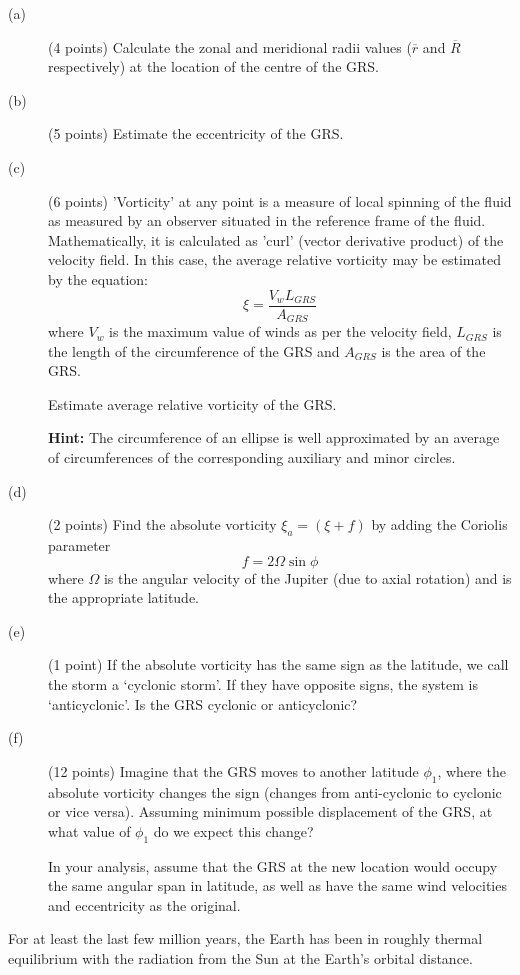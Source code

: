 \begin{description}
\item[(a)] (4 points) Calculate the zonal and meridional radii values ($\overline{r}$
  and $\overline{R}$ respectively) at the location of the centre of the GRS.
\item[(b)] (5 points) Estimate the eccentricity of the GRS.
\item[(c)] (6 points) 'Vorticity' at any point is a measure of local spinning
  of the fluid as measured by an observer situated in the reference frame of
  the fluid. Mathematically, it is calculated as 'curl' (vector derivative
  product) of the velocity field. In this case, the average relative
  vorticity may be estimated by the equation:
  \[ \xi = \frac{V_w L_{GRS}}{A_{GRS}} \]
  where $V_w$ is the maximum value of winds as per the velocity field,
  $L_{GRS}$ is the length of the circumference of the GRS and $A_{GRS}$ is
  the area of the GRS.

  Estimate average relative vorticity of the GRS.

  \textbf{Hint:} The circumference of an ellipse is well approximated by an
  average of circumferences of the corresponding auxiliary and minor circles.
\item[(d)] (2 points) Find the absolute vorticity $\xi_a = (\xi + f)$ by
  adding the Coriolis parameter
  \[ f = 2\Omega \sin\phi \]
  where $\Omega$ is the angular velocity of the Jupiter (due to axial
  rotation) and is the appropriate latitude.
\item[(e)] (1 point) If the absolute vorticity has the same sign as the
  latitude, we call the storm a `cyclonic storm'. If they have opposite
  signs, the system is `anticyclonic'. Is the GRS cyclonic or anticyclonic?
\item[(f)] (12 points) Imagine that the GRS moves to another latitude
  $\phi_1$, where the absolute vorticity changes the sign (changes from
  anti-cyclonic to cyclonic or vice versa). Assuming minimum possible
  displacement of the GRS, at what value of $\phi_1$ do we expect this
  change?

  In your analysis, assume that the GRS at the new location would occupy the
  same angular span in latitude, as well as have the same wind velocities and
  eccentricity as the original.
\end{description}

For at least the last few million years, the Earth has been in roughly
thermal equilibrium with the radiation from the Sun at the Earth's orbital
distance.

